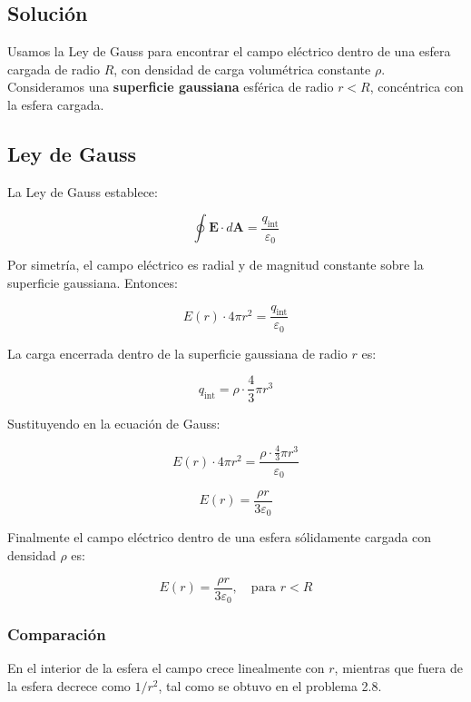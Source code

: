 \documentclass[12pt]{article}
\begin{document}
\subsection*{Solución}

Usamos la Ley de Gauss para encontrar el campo eléctrico dentro de una esfera cargada de radio \( R \), con densidad de carga volumétrica constante \( \rho \). Consideramos una \textbf{superficie gaussiana} esférica de radio \( r < R \), concéntrica con la esfera cargada.

\subsection*{Ley de Gauss}

La Ley de Gauss establece:

\[
\oint \mathbf{E} \cdot d\mathbf{A} = \frac{q_{\text{int}}}{\varepsilon_0}
\]

Por simetría, el campo eléctrico es radial y de magnitud constante sobre la superficie gaussiana. Entonces:

\[
E(r) \cdot 4\pi r^2 = \frac{q_{\text{int}}}{\varepsilon_0}
\]

La carga encerrada dentro de la superficie gaussiana de radio \( r \) es:

\[
q_{\text{int}} = \rho \cdot \frac{4}{3} \pi r^3
\]

Sustituyendo en la ecuación de Gauss:

\[
E(r) \cdot 4\pi r^2 = \frac{\rho \cdot \frac{4}{3} \pi r^3}{\varepsilon_0}
\]

\[
E(r) = \frac{\rho r}{3 \varepsilon_0}
\]

Finalmente el campo eléctrico dentro de una esfera sólidamente cargada con densidad \( \rho \) es:

\[
\boxed{E(r) = \frac{\rho r}{3 \varepsilon_0}, \quad \text{para } r < R}
\]

\subsubsection*{Comparación }

En el interior de la esfera el campo crece linealmente con \( r \), mientras que fuera de la esfera decrece como \( 1/r^2 \), tal como se obtuvo en el problema 2.8.


\end{document}
